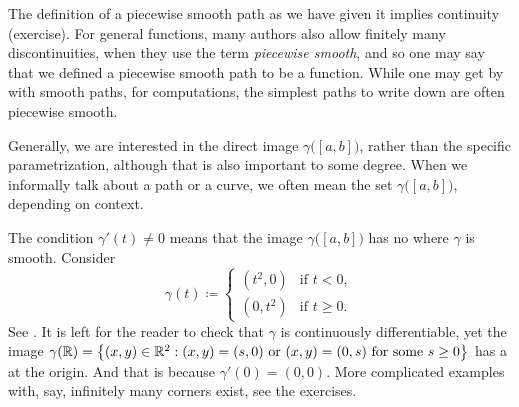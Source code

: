 The definition of a piecewise smooth path as we have given it implies
continuity (exercise).  For general functions, many authors also
allow finitely many discontinuities, when they use the term \emph{piecewise
smooth}, and so one may say that we defined a piecewise smooth path
to be a \emph{} function.
While one may get by with smooth paths, for computations, the simplest
paths to write down are often piecewise smooth.

Generally, we are interested in the direct image $\gamma\bigl([a,b]\bigr)$,
rather than the specific parametrization, although that is also
important to some degree.  When we informally talk about a path or a curve,
we often mean the set $\gamma\bigl([a,b]\bigr)$, depending
on context.


\begin{example}
The condition $\gamma'(t) \neq 0$ means that the image
$\gamma\bigl([a,b]\bigr)$
has no  where $\gamma$ is smooth.
Consider 
\begin{equation*}
\gamma(t) \coloneqq
\begin{cases}
(t^2,0) & \text{if } t < 0,\\
(0,t^2) & \text{if } t \geq 0.
\end{cases}
\end{equation*}
See .
It is left for the reader to check that $\gamma$ is continuously
differentiable, yet the image $\gamma({\mathbb{R}}) = \bigl\{ (x,y) \in {\mathbb{R}}^2 : (x,y) =
(s,0) \text{ or } (x,y) = (0,s) \text{ for some } s \geq 0 \bigr\}$ has a
 at the origin.  And that is because $\gamma'(0) = (0,0)$.
More complicated examples with, say, infinitely many corners exist,
see the exercises.
\begin{myfigureht}
\caption{ path with a corner if we allow zero derivative.  The
points corresponding to several values of
$t$ are marked with dots.\label{fig:cornersmoothpath}}
\end{myfigureht}
\end{example}

